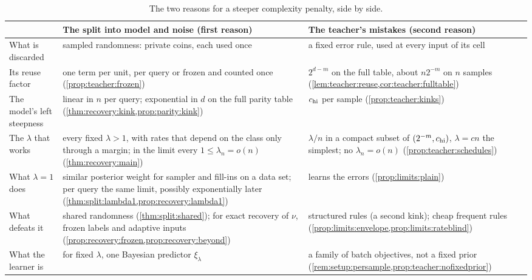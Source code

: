 \begin{table}[ht]
\centering\footnotesize\crefabbrev\setlength{\tabcolsep}{4pt}
\begin{tabularx}{\linewidth}{@{}>{\raggedright\arraybackslash}p{2.2cm}>{\raggedright\arraybackslash\hsize=1.18\hsize}X>{\raggedright\arraybackslash\hsize=0.82\hsize}X@{}}
\toprule
 & The split into model and noise (first reason) & The teacher's mistakes (second reason)\\
\midrule
What is discarded & sampled randomness: private coins, each used once & a fixed error rule, used at every input of its cell\\
Its reuse factor & one term per unit, per query or frozen and counted once (\cref{prop:teacher:frozen}) & $2^{d-m}$ on the full table, about $n2^{-m}$ on $n$ samples (\cref{lem:teacher:reuse,cor:teacher:fulltable})\\
The model's left steepness & linear in $n$ per query; exponential in $d$ on the full parity table (\cref{thm:recovery:kink,prop:parity:kink}) & $c_{\rm hi}$ per sample (\cref{prop:teacher:kinks})\\
The $\lambda$ that works & every fixed $\lambda>1$, with rates that depend on the class only through a margin; in the limit every $1\le\lambda_n=o(n)$ (\cref{thm:recovery:main}) & $\lambda/n$ in a compact subset of $(2^{-m},c_{\rm hi})$, $\lambda=cn$ the simplest; no $\lambda_n=o(n)$ (\cref{prop:teacher:schedules})\\
What $\lambda=1$ does & similar posterior weight for sampler and fill-ins on a data set; per query the same limit, possibly exponentially later (\cref{thm:split:lambda1,prop:recovery:lambda1}) & learns the errors (\cref{prop:limits:plain})\\
What defeats it & shared randomness (\cref{thm:split:shared}); for exact recovery of $\nu$, frozen labels and adaptive inputs (\cref{prop:recovery:frozen,prop:recovery:beyond}) & structured rules (a second kink); cheap frequent rules (\cref{prop:limits:envelope,prop:limits:rateblind})\\
What the learner is & for fixed $\lambda$, one Bayesian predictor $\xi_\lambda$ & a family of batch objectives, not a fixed prior (\cref{rem:setup:persample,prop:teacher:nofixedprior})\\
\bottomrule
\end{tabularx}
\caption{The two reasons for a steeper complexity penalty, side by side.}\label{tab:discussion:reasons}
\end{table}

